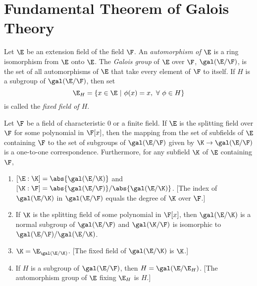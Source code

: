 \section{Fundamental Theorem of Galois Theory}

\begin{definition}
	Let $\E$ be an extension field of the field $\F$. An \textit{automorphism of $\E$} is a ring isomorphism from $\E$ onto $\E$. The \textit{Galois group} of $\E$ over $\F$, $\gal(\E/\F)$, is the set of all automorphisms of $\E$ that take every element of $\F$ to itself. If $H$ is a subgroup of $\gal(\E/\F)$, then set
	\[ \E_H = \{x \in \E\ \vert\ \phi(x) = x,\ \forall\ \phi \in H\} \]
	is called the \textit{fixed field of $H$}.
\end{definition}

\begin{theorem}
	Let $\F$ be a field of characteristic 0 or a finite field. If $\E$ is the splitting field over $\F$ for some polynomial in $\F[x]$, then the mapping from the set of subfields of $\E$ containing $\F$ to the set of subgroups of $\gal(\E/\F)$ given by $\K \to \gal(\E/\F)$ is a one-to-one correspondence. Furthermore, for any subfield $\K$ of $\E$ containing $\F$,
	\begin{enumerate}
		\item $[\E:\K] = \abs{\gal(\E/\K)}$ and $[\K:\F] = \abs{\gal(\E/\F)} / \abs{\gal(\E/\K)}$. [The index of $\gal(\E/\K)$ in $\gal(\E/\F)$ equals the degree of $\K$ over $\F$.]
		\item If $\K$ is the splitting field of some polynomial in $\F[x]$, then $\gal(\E/\K)$ is a normal subgroup of $\gal(\E/\F)$ and $\gal(\K/\F)$ is isomorphic to $\gal(\E/\F)/\gal(\E/\K)$.
		\item $\K = \E_{\gal(\E/\K)}$. [The fixed field of $\gal(\E/\K)$ is $\K$.]
		\item If $H$ is a subgroup of $\gal(\E/\F)$, then $H=\gal(\E/\E_H)$. [The automorphism group of $\E$ fixing $\E_H$ is $H$.]
	\end{enumerate}
\end{theorem}
